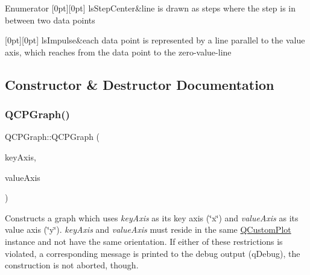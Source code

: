 \begin{DoxyEnumFields}{Enumerator}
[0pt][0pt]{}\mbox{\label{classQCPGraph_ad60175cd9b5cac937c5ee685c32c0859a5adf7b04da215a40a764c21294ea7366}} 
ls\+Step\+Center&line is drawn as steps where the step is in between two data points \\
\hline

[0pt][0pt]{}\mbox{\label{classQCPGraph_ad60175cd9b5cac937c5ee685c32c0859aa3b358b4ae7cca94aceeb8e529c12ebb}} 
ls\+Impulse&each data point is represented by a line parallel to the value axis, which reaches from the data point to the zero-\/value-\/line \\
\hline

\end{DoxyEnumFields}


\subsection{Constructor \& Destructor Documentation}
\mbox{\label{classQCPGraph_a0393a38cf7183cbf46348eb6cf9a5a6c}} 
\subsubsection{\texorpdfstring{Q\+C\+P\+Graph()}{QCPGraph()}}
{\footnotesize\ttfamily Q\+C\+P\+Graph\+::\+Q\+C\+P\+Graph (\begin{DoxyParamCaption}\item[{\hyperlink{classQCPAxis}{Q\+C\+P\+Axis} $\ast$}]{key\+Axis,  }\item[{\hyperlink{classQCPAxis}{Q\+C\+P\+Axis} $\ast$}]{value\+Axis }\end{DoxyParamCaption})\hspace{0.3cm}{\ttfamily [explicit]}}

Constructs a graph which uses {\itshape key\+Axis} as its key axis (\char`\"{}x\char`\"{}) and {\itshape value\+Axis} as its value axis (\char`\"{}y\char`\"{}). {\itshape key\+Axis} and {\itshape value\+Axis} must reside in the same \hyperlink{classQCustomPlot}{Q\+Custom\+Plot} instance and not have the same orientation. If either of these restrictions is violated, a corresponding message is printed to the debug output (q\+Debug), the construction is not aborted, though.

